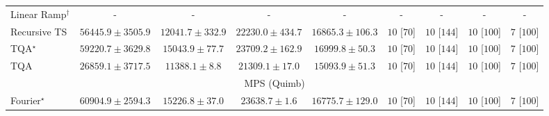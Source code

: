 \begin{tabular}{l|cccc|cccc|}
Linear Ramp$^\dagger$ & {\cellcolor[HTML]{000000}} \color[HTML]{F1F1F1} {\cellcolor{white}} \color{black} - & {\cellcolor[HTML]{000000}} \color[HTML]{F1F1F1} {\cellcolor{white}} \color{black} - & {\cellcolor[HTML]{000000}} \color[HTML]{F1F1F1} {\cellcolor{white}} \color{black} - & {\cellcolor[HTML]{000000}} \color[HTML]{F1F1F1} {\cellcolor{white}} \color{black} - & {\cellcolor[HTML]{000000}} \color[HTML]{F1F1F1} {\cellcolor{white}} \color{black} - & {\cellcolor[HTML]{000000}} \color[HTML]{F1F1F1} {\cellcolor{white}} \color{black} - & {\cellcolor[HTML]{000000}} \color[HTML]{F1F1F1} {\cellcolor{white}} \color{black} - & {\cellcolor[HTML]{000000}} \color[HTML]{F1F1F1} {\cellcolor{white}} \color{black} - \\
Recursive TS & {\cellcolor[HTML]{832088}} \color[HTML]{F1F1F1} $56445.9\pm 3505.9$ & {\cellcolor[HTML]{F1F8FB}} \color[HTML]{000000} $12041.7\pm 332.9$ & {\cellcolor[HTML]{C8DAEA}} \color[HTML]{000000} $22230.0\pm 434.7$ & {\cellcolor[HTML]{E1EDF5}} \color[HTML]{000000} $16865.3\pm 106.3$ & {\cellcolor[HTML]{49006A}} \color[HTML]{F1F1F1} $10$ [$70$] & {\cellcolor[HTML]{49006A}} \color[HTML]{F1F1F1} $10$ [$144$] & {\cellcolor[HTML]{49006A}} \color[HTML]{F1F1F1} $10$ [$100$] & {\cellcolor[HTML]{CD238F}} \color[HTML]{F1F1F1} $7$ [$100$] \\
TQA$^\star$ & {\cellcolor[HTML]{800F7B}} \color[HTML]{F1F1F1} $59220.7\pm 3629.8$ & {\cellcolor[HTML]{E7F1F7}} \color[HTML]{000000} $15043.9\pm 77.7$ & {\cellcolor[HTML]{C1D4E7}} \color[HTML]{000000} $23709.2\pm 162.9$ & {\cellcolor[HTML]{E1ECF4}} \color[HTML]{000000} $16999.8\pm 50.3$ & {\cellcolor[HTML]{49006A}} \color[HTML]{F1F1F1} $10$ [$70$] & {\cellcolor[HTML]{49006A}} \color[HTML]{F1F1F1} $10$ [$144$] & {\cellcolor[HTML]{49006A}} \color[HTML]{F1F1F1} $10$ [$100$] & {\cellcolor[HTML]{CD238F}} \color[HTML]{F1F1F1} $7$ [$100$] \\
TQA & {\cellcolor[HTML]{B2CAE1}} \color[HTML]{000000} $26859.1\pm 3717.5$ & {\cellcolor[HTML]{F3F9FC}} \color[HTML]{000000} $11388.1\pm 8.8$ & {\cellcolor[HTML]{CCDDEC}} \color[HTML]{000000} $21309.1\pm 17.0$ & {\cellcolor[HTML]{E7F1F7}} \color[HTML]{000000} $15093.9\pm 51.3$ & {\cellcolor[HTML]{49006A}} \color[HTML]{F1F1F1} $10$ [$70$] & {\cellcolor[HTML]{49006A}} \color[HTML]{F1F1F1} $10$ [$144$] & {\cellcolor[HTML]{49006A}} \color[HTML]{F1F1F1} $10$ [$100$] & {\cellcolor[HTML]{CD238F}} \color[HTML]{F1F1F1} $7$ [$100$] \\
\cline{1-9}
\multicolumn{9}{c}{\rule{0pt}{8pt}MPS (Quimb)} \\
\midrule
Fourier$^\star$ & {\cellcolor[HTML]{8B3005}} \color[HTML]{F1F1F1} $60904.9\pm 2594.3$ & {\cellcolor[HTML]{FFF9C7}} \color[HTML]{000000} $15226.8\pm 37.0$ & {\cellcolor[HTML]{FEE595}} \color[HTML]{000000} $23638.7\pm 1.6$ & {\cellcolor[HTML]{FFF7BE}} \color[HTML]{000000} $16775.7\pm 129.0$ & {\cellcolor[HTML]{49006A}} \color[HTML]{F1F1F1} $10$ [$70$] & {\cellcolor[HTML]{49006A}} \color[HTML]{F1F1F1} $10$ [$144$] & {\cellcolor[HTML]{49006A}} \color[HTML]{F1F1F1} $10$ [$100$] & {\cellcolor[HTML]{CD238F}} \color[HTML]{F1F1F1} $7$ [$100$] \\

\end{tabular}
